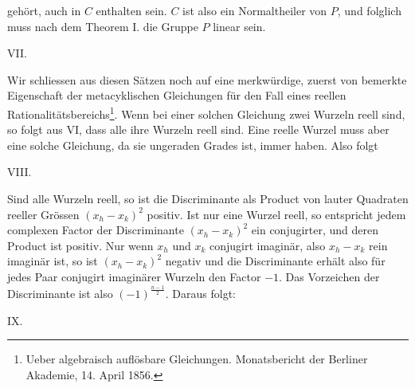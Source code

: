 gehört, auch in $C$ enthalten sein. $C$ ist also ein Normaltheiler
von $P$, und folglich muss nach dem Theorem I. die Gruppe $P$
linear sein.

VII.~

Wir schliessen aus diesen Sätzen noch auf eine merkwürdige,
zuerst von  bemerkte Eigenschaft der metacyklischen
Gleichungen für den Fall eines reellen Rationalitätsbereichs\footnote{Ueber algebraisch auflösbare Gleichungen. Monatsbericht der Berliner
Akademie, 14. April 1856.}.
Wenn bei einer solchen Gleichung zwei Wurzeln reell sind, so
folgt aus VI, dass alle ihre Wurzeln reell sind. Eine reelle
Wurzel muss aber eine solche Gleichung, da sie ungeraden
Grades ist, immer haben. Also folgt

VIII.~

Sind alle Wurzeln reell, so ist die Discriminante als Product
von lauter Quadraten reeller Grössen $(x_h - x_k)^2$ positiv. Ist nur
eine Wurzel reell, so entspricht jedem complexen Factor der
Discriminante $(x_h - x_k)^2$ ein conjugirter, und deren Product ist
positiv. Nur wenn $x_h$ und $x_k$ conjugirt imaginär, also $x_h - x_k$
rein imaginär ist, so ist $(x_h - x_k)^2$ negativ und die Discriminante
erhält also für jedes Paar conjugirt imaginärer Wurzeln den
Factor $-1$. Das Vorzeichen der Discriminante ist also $(-1)^{\frac{n-1}{2}}$.
Daraus folgt:

IX.~

